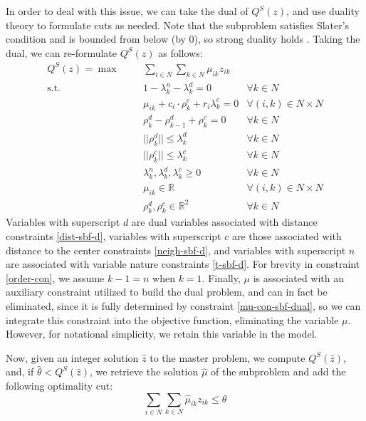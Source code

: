 \documentclass[pdflatex,sn-mathphys-num]{sn-jnl}%
\begin{document}
In order to deal with this issue, we can take the dual of $Q^S(z)$, and use duality theory to formulate cuts as needed. Note that the subproblem satisfies Slater's condition and is bounded from below 
(by 0), so strong duality holds \cite{slaters-cond}. Taking the dual, we can re-formulate $Q^S(z)$ as follows:
\begin{subequations} \label{dual-sbf}
\begin{align}
Q^S(z) = \max &&& \sum_{i \in N}\sum_{k \in N} \mu_{ik} z_{ik} & \label{obj-dual-sbf}\\
\text{s.t.} &&& 1 - \lambda_k^n - \lambda_k^d = 0 & \forall k \in N\\
&&& \mu_{ik} + c_i \cdot \rho^c_k + r_i\lambda^c_k = 0 &\forall (i,k) \in N \times N \label{mu-con-sbf-dual}\\
&&& \rho_k^d - \rho_{k-1}^d + \rho_k^c = 0 & \forall k \in N \label{order-con}\\
&&&||\rho_k^d|| \leq \lambda_k^d & \forall k \in N\\
&&& ||\rho_k^c|| \leq \lambda_k^c & \forall k \in N\\
&&& \lambda_k^n, \lambda_k^d, \lambda_k^c \geq 0 & \forall k \in N \\
&&& \mu_{ik} \in \mathbb{R} & \forall (i,k) \in N \times N\\
&&& \rho_k^d, \rho_k^c \in \mathbb{R}^2 & \forall k \in N
\end{align}
\end{subequations}
Variables with superscript $d$ are dual variables associated with distance constraints \eqref{dist-sbf-d}, variables with superscript $c$ are those associated with distance to the center constraints \eqref{neigh-sbf-d}, and variables with superscript $n$ are associated with variable nature constraints \eqref{t-sbf-d}. For brevity in constraint \eqref{order-con}, we assume $k - 1 = n$ when $k = 1$. Finally, $\mu$ is associated with an auxiliary constraint utilized to build the dual problem, and can in fact be eliminated, since it is fully determined by constraint \eqref{mu-con-sbf-dual}, so we can integrate this constraint into the objective function, eliminating the variable $\mu$. However, for notational simplicity, we retain this variable in the model.

Now, given an integer solution $\hat{z}$ to the master problem, we compute $Q^S(\hat{z})$, and, if $\hat{\theta} < Q^S(\hat{z})$, we retrieve the solution $\hat{\mu}$ of the subproblem and add the following optimality cut:
\begin{equation}
    \sum_{i \in N}\sum_{k \in N} \hat{\mu}_{ik} z_{ik} \leq \theta
\end{equation}
\end{document}
